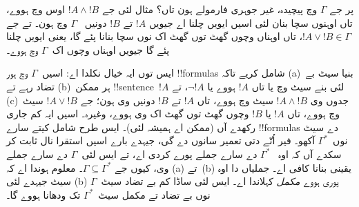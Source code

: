 \documentclass[../../../include/open-logic-section]{subfiles}
\begin{document}
پر جے $\Gamma$ وچ پیچیدہ، غیر جوہری فارمولے ہون تاں؟
مثال لئی جے $!A \land !B$ اوس وچ ہووے، تاں اوہنوں سچا
بنان لئی اسیں ایویں چلنا اے جیویں $!A$ تے $!B$ دونیں
~$\Gamma$ وچ ہون۔ تے جے $!A \lor !B \in \Gamma$، تاں
اوہناں وچوں گھٹ توں گھٹ اک نوں سچا بنانا پئے گا، یعنی
ایویں چلنا پئے گا جیویں اوہناں وچوں اک~$\Gamma$ وچ ہووے۔

ایس توں ایہ خیال نکلدا اے: اسیں~$\Gamma$ وچ ہور
!!{formula}s شامل کریے تاکہ (a)~بنیا سیٹ بے تضاد رہے تے
(b)~ہر ممکن !!{sentence}~$!A$ لئی بنے سیٹ وچ یا تاں
$!A$ ہووے یا $\lnot !A$، تے (c)~جدوں وی
$!A \land !B$ سیٹ وچ ہووے، تاں $!A$ تے $!B$ دونیں
وی ہون؛ جے $!A \lor !B$ سیٹ وچ ہووے، تاں $!A$ یا $!B$
وچوں گھٹ توں گھٹ اک وی ہووے، وغیرہ۔ اسیں ایہ کم جاری رکھدے
آں (ممکن اے ہمیشہ لئی)۔ ایس طرح شامل کیتے سارے
!!{formula}s دے سیٹ نوں~$\Gamma^*$ آکھو۔ فیر اُتّے دتی
تعمیر سانوں 
دے گی، جیہدے بارے اسیں استقرا نال ثابت کر سکدے آں کہ اوہ
~$\Gamma^*$ دے سارے جملے پورے کردی اے، تے ایس لئی~$\Gamma$
دے سارے جملے وی، کیوں جے $\Gamma \subseteq \Gamma^*$۔
معلوم ہوندا اے کہ (a) تے~(b) یقینی بنانا کافی اے۔ جملیاں دا
اوہ سیٹ جیہدے لئی (b) پوری ہووے \emph{مکمل} کہلاندا اے۔
ایس لئی ساڈا کم بے تضاد سیٹ~$\Gamma$ نوں بے تضاد تے مکمل
سیٹ~$\Gamma^*$ تک ودھانا ہووے گا۔
\end{document}
